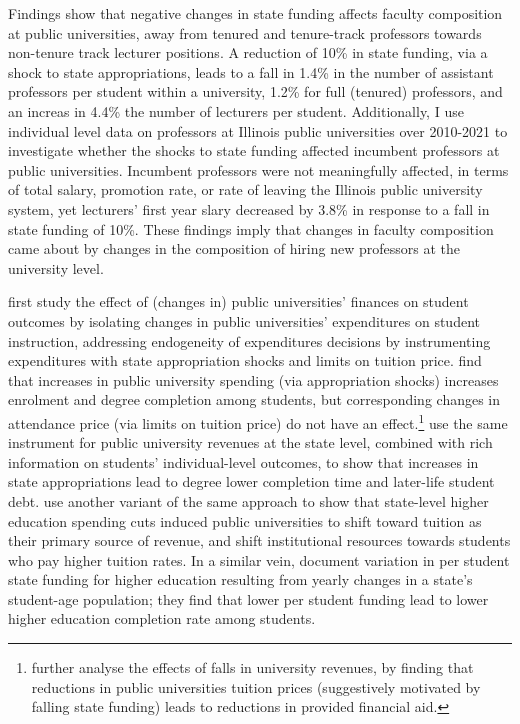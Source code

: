 \documentclass[notitlepage,12pt]{article}
\begin{document}
Findings show that negative changes in state funding affects faculty composition at public universities, away from tenured and tenure-track professors towards non-tenure track lecturer positions.
A reduction of 10\% in state funding, via a shock to state appropriations, leads to a fall in 1.4\% in the number of assistant professors per student within a university, 1.2\% for full (tenured) professors, and an increas in 4.4\% the number of lecturers per student.
Additionally, I use individual level data on professors at Illinois public universities over 2010-2021 to investigate whether the shocks to state funding affected incumbent professors at public universities.
Incumbent professors were not meaningfully affected, in terms of total salary, promotion rate, or rate of leaving the Illinois public university system, yet lecturers' first year slary decreased by 3.8\% in response to a fall in state funding of 10\%.
These findings imply that changes in faculty composition came about by changes in the composition of hiring new professors at the university level.

\cite{NBERw23736} first study the effect of (changes in) public universities' finances on student outcomes by isolating changes in public universities' expenditures on student instruction, addressing endogeneity of expenditures decisions by instrumenting expenditures with state appropriation shocks and limits on tuition price.
\cite{NBERw23736} find that increases in public university spending (via appropriation shocks) increases enrolment and degree completion among students, but corresponding changes in attendance price (via limits on tuition price) do not have an effect.\footnote{
    \cite{miller2022making} further analyse the effects of falls in university revenues, by finding that reductions in public universities tuition prices (suggestively motivated by falling state funding) leads to reductions in provided financial aid.
}
\cite{chakrabarti2018effect,NBERw27885} use the same instrument for public university revenues at the state level, combined with rich information on students' individual-level outcomes, to show that increases in state appropriations lead to degree lower completion time and later-life student debt.
\cite{bound2019public} use another variant of the same approach to show that state-level higher education spending cuts induced public universities to shift toward tuition as their primary source of revenue, and shift institutional resources towards students who pay higher tuition rates.
In a similar vein, \cite{bound2007cohort} document variation in per student state funding for higher education resulting from yearly changes in a state's student-age population; they find that lower per student funding lead to lower higher education completion rate among students.
\end{document}
